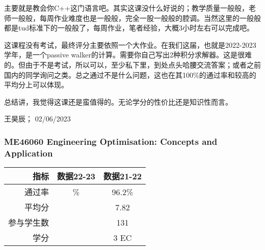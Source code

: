 主要就是教会你C++这门语言吧。其实这课没什么好说的；教学质量一般般，老师一般般，每周作业难度也是一般般，完全一股一般般的腔调。当然这里的一般般都是tud标准下的一般般了，每周作业，笔者经验，大概3小时左右可以完成吧。

这课程没有考试，最终评分主要依照一个大作业。在我们这届，也就是2022-2023学年，是一个passive walker的计算。需要你自己写出2种积分求解器。这是很难的。但由于不是考试，所以可以，至少私下里，到处点头哈腰交流答案；或者之前国内的同学询问之类。总之通过不是什么问题，这也在其100\%的通过率和较高的平均分上可以体现。

总结讲，我觉得这课还是蛮值得的。无论学分的性价比还是知识性而言。
\begin{flushright}
王昊辰； 02/06/2023
\end{flushright}


\subsubsection{ME46060 Engineering Optimisation: Concepts and Application}
\begin{minipage}{0.45\textwidth}
\raggedleft
\begin{tabular}{r|c|c}
\textbf{指标} & \textbf{数据22-23}& \textbf{数据21-22} \\ \hline
通过率 &\% & 96.2\% \\ 
平均分 & & 7.82 \\ 
参与学生数&  & 131 \\
学分 & & 3 EC\\
\end{tabular}
\end{minipage}\\

